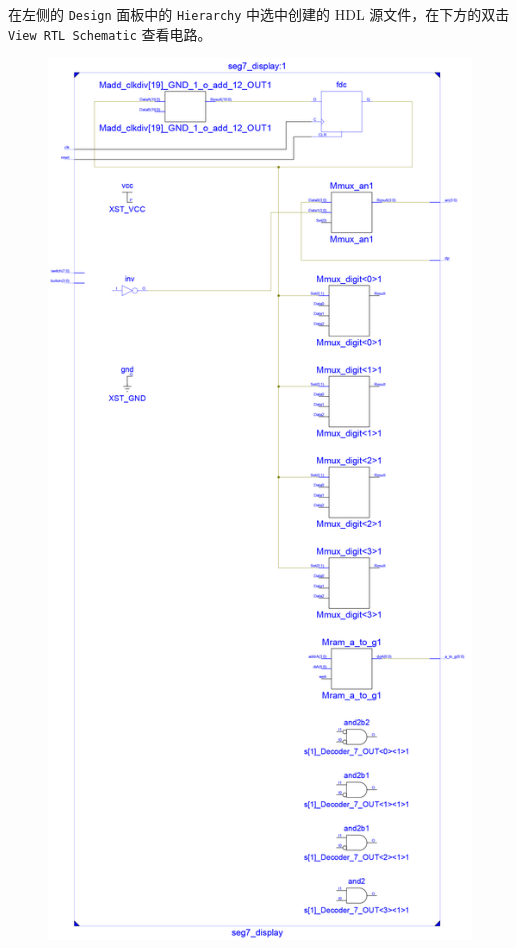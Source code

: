 \documentclass{ctexart}
\begin{document}
            
            在左侧的 \verb|Design| 面板中的 \verb|Hierarchy| 中选中创建的 HDL 源文件，在下方的双击 \verb|View RTL Schematic| 查看电路。
            
        \begin{figure}
            \centering
            \includegraphics[width=1\linewidth]{report1-circiut-2.jpg}
            \caption[Circuit]{}
            \label{fig:report1-circiut-2}
        \end{figure}
        
\end{document}
